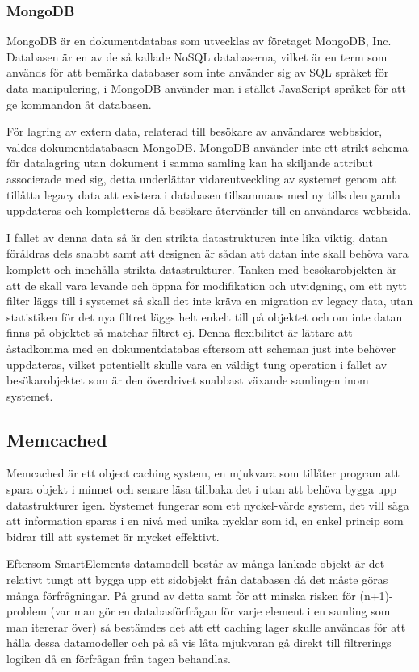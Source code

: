 \subsubsection{MongoDB}

MongoDB är en dokumentdatabas som utvecklas av företaget MongoDB, Inc. Databasen är en av de så kallade NoSQL databaserna, vilket är en term som används för att bemärka databaser som inte använder sig av SQL språket för data-manipulering, i MongoDB använder man i stället JavaScript språket för att ge kommandon åt databasen.

För lagring av extern data, relaterad till besökare av användares webbsidor, valdes dokumentdatabasen MongoDB. MongoDB använder inte ett strikt schema för datalagring utan dokument i samma samling kan ha skiljande attribut associerade med sig, detta underlättar vidareutveckling av systemet genom att tillåtta legacy data att existera i databasen tillsammans med ny tills den gamla uppdateras och kompletteras då besökare återvänder till en användares webbsida.

I fallet av denna data så är den strikta datastrukturen inte lika viktig, datan föråldras dels snabbt samt att designen är sådan att datan inte skall behöva vara komplett och innehålla strikta datastrukturer. Tanken med besökarobjekten är att de skall vara levande och öppna för modifikation och utvidgning, om ett nytt filter läggs till i systemet så skall det inte kräva en migration av legacy data, utan statistiken för det nya filtret läggs helt enkelt till på objektet och om inte datan finns på objektet så matchar filtret ej. Denna flexibilitet är lättare att åstadkomma med en dokumentdatabas eftersom att scheman just inte behöver uppdateras, vilket potentiellt skulle vara en väldigt tung operation i fallet av besökarobjektet som är den överdrivet snabbast växande samlingen inom systemet.

\subsection{Memcached}

Memcached är ett object caching system, en mjukvara som tillåter program att spara objekt i minnet och senare läsa tillbaka det i utan att behöva bygga upp datastrukturer igen. Systemet fungerar som ett nyckel-värde system, det vill säga att information sparas i en nivå med unika nycklar som id, en enkel princip som bidrar till att systemet är mycket effektivt. \citep{memcachedwiki}

Eftersom SmartElements datamodell består av många länkade objekt är det relativt tungt att bygga upp ett sidobjekt från databasen då det måste göras många förfrågningar. På grund av detta samt för att minska risken för (n+1)-problem (var man gör en databasförfrågan för varje element i en samling som man itererar över) så bestämdes det att ett caching lager skulle användas för att hålla dessa datamodeller och på så vis låta mjukvaran gå direkt till filtrerings logiken då en förfrågan från tagen behandlas.

